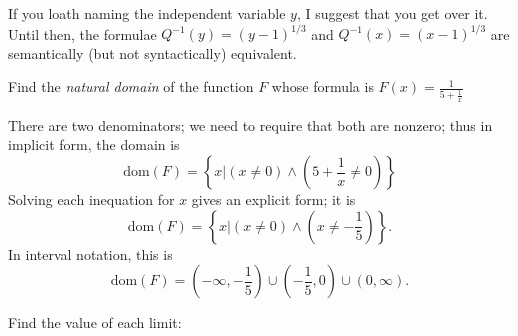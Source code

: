 \documentclass[12pt, answers,fleqn]{exam}
\newcommand{\dom}{\mbox{dom}}
\begin{document}
\begin{questions}
\begin{solution}
    \quad If you loath naming the independent  variable $y$, I
    suggest that you get over it. Until then, the formulae 
    $Q^{-1}(y) = (y-1)^{1/3}$ and $Q^{-1}(x) = (x-1)^{1/3}$
    are semantically (but not syntactically) equivalent.
\end{solution}
    \question   Find the \emph{natural domain} of the function $F$ whose
formula is $F(x) = \frac{1}{5+ \frac{1}{x}}$
\begin{solution}%
    There are two denominators; we need to require that both are nonzero; thus
    in implicit form, the domain is
    \[
        \dom(F) = \left \{ x | (x \neq 0) \land (5+ \frac{1}{x} \neq 0) \right \}
    \]
    Solving each inequation for $x$ gives an explicit form; it is
    \[
        \dom(F) = \left \{ x | (x \neq 0) \land (x  \neq -\frac{1}{5}) \right \}.
    \]
    In interval notation, this is
    \[   \dom(F) = (-\infty, -\frac{1}{5}) \cup (-\frac{1}{5},0) \cup
          (0, \infty).
        \]
\end{solution}



\question Find the value of each limit:

\end{questions}
\end{document}
